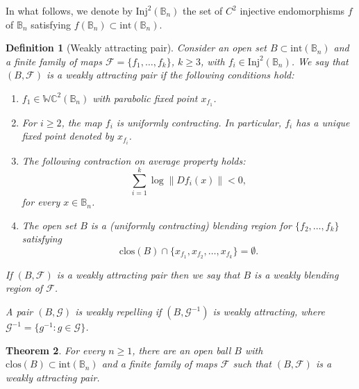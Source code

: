 \documentclass[11pt,reqno]{amsart}
\theoremstyle{plain}
\newtheorem{theorem}{Theorem}[section]
\newtheorem{definition}[theorem]{Definition}
\newtheorem*{theorem A}{Theorem A}
\newtheorem*{theorem B}{Theorem B}
\newtheorem*{theorem C}{Theorem C}
\newtheorem*{theorem 1}{Theorem 1}
\newtheorem*{theorem 2}{Theorem 2}
\newtheorem*{theorem 3}{Theorem 3}
\numberwithin{equation}{section}
\begin{document}
In what follows, we denote by $\mathrm{Inj}^2 (\mathbb{B}_n)$ the set of $C^2$ injective endomorphisms $f$ of $\mathbb{B}_n$ satisfying $f(\mathbb{B}_n)\subset \text{int}(\mathbb{B}_n)$.

\begin{definition}[Weakly attracting pair]\label{weakpair}
Consider an open set $B \subset \mathrm{int}(\mathbb{B}_n)$ and a finite family of maps $\mathcal{F}=\{f_1, \ldots, f_k\}$, $k\ge 3$, with $f_i \in \mathrm{Inj}^2 (\mathbb{B}_n)$.
We say that $(B,\mathcal{F})$ is a \emph{weakly attracting pair} if the following conditions hold:
\begin{enumerate}
\item[(H1)] $f_1 \in\mathbb{WC}^2 ( \mathbb{B}_n)$ with parabolic fixed point $x_{f_1}$.
\item[(H2)] For $i\ge 2$, the map $f_{i}$ is uniformly contracting. In particular, $f_i$ has a unique fixed point denoted by $x_{f_i}$.
\item[(H3)]
The following contraction on average property holds:
\begin{equation}\label{3333}
\sum_{i=1}^{k} \log \|D f_{i}(x)\| <0,
\end{equation}
for every $x\in \mathbb{B}_n$.
\item [(H4)] The open set $B$ is a (uniformly contracting) blending region for $\{f_2, \ldots, f_k\}$ satisfying
$$
\mathrm{clos}(B) \cap \{x_{f_1}, x_{f_2}, \dots, x_{f_k}\} =\emptyset.
$$
\end{enumerate}
If $(B,\mathcal{F})$ is a weakly attracting pair then we say that $B$ is a \emph{weakly blending region} of $\mathcal{F}$.

A pair $(B,\mathcal{G})$ is \emph{weakly repelling} if $(B,\mathcal{G}^{-1})$ is weakly attracting, where $\mathcal{G}^{-1}=\{g^{-1} \colon g \in \mathcal{G}\}$.
\end{definition}

\begin{theorem}\label{problend}
For every $n\ge 1$, there are an open ball $B$ with $\mathrm{clos}(B) \subset \mathrm{int}(\mathbb{B}_n)$ and a finite family of maps $\mathcal{F}$ such that $(B, \mathcal{F})$ is a weakly attracting pair.
\end{theorem}
\end{document}
